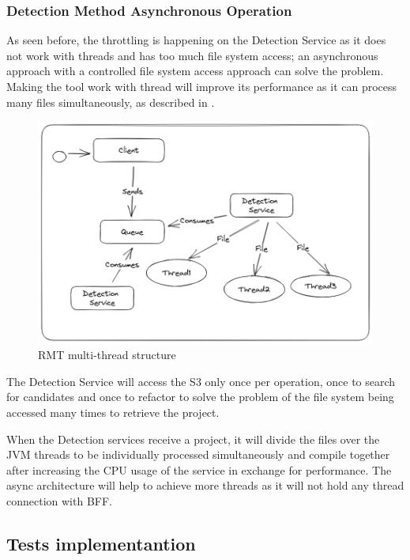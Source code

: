 \subsubsection{Detection Method Asynchronous Operation}
\label{sub-async}
As seen before, the throttling is happening on the Detection Service as it does not work with threads and has too much file system access; an asynchronous approach with a controlled file system access approach can solve the problem. Making the tool work with thread will improve its performance as it can process many files simultaneously, as described in .

\begin{figure}[ht!]
\SetCaptionWidth{\textwidth}
\caption{RMT multi-thread structure}
\label{fig-threading}
\includegraphics[width =\textwidth, scale=0.2]{Chapter-4/Figures/threadDivision.png}
\end{figure}

The Detection Service will access the S3 only once per operation, once to search for candidates and once to refactor to solve the problem of the file system being accessed many times to retrieve the project.

When the Detection services receive a project, it will divide the files over the JVM threads to be individually processed simultaneously and compile together after increasing the CPU usage of the service in exchange for performance. The async architecture will help to achieve more threads as it will not hold any thread connection with BFF.

\subsection{Tests implementantion}
\label{sub-tests}

